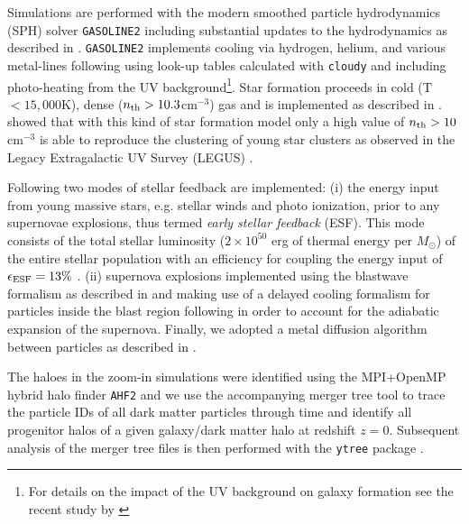 \documentclass[useAMS,usenatbib]{mnras}
\begin{document}
Simulations are performed with the modern smoothed particle hydrodynamics (SPH) solver {\texttt{GASOLINE2}} \citep{Wadsley2017} including substantial updates to the hydrodynamics as described in \citet{Keller2014}. {\texttt{GASOLINE2}} implements cooling via hydrogen, helium, and various metal-lines following \citet{Shen2010} using look-up tables calculated with \texttt{cloudy} \citep[version 07.02;][]{Ferland1998} and including photo-heating from the \citet{Haardt2005} UV background\footnote{For details on the impact of the UV background on galaxy formation see the recent study by \citet{Obreja2019}}. Star formation proceeds in cold (T $< 15,000$K), dense ($n_{\rm  th}  >  10.3$cm$^{-3}$) gas and is implemented as described in \citet{Stinson2006}. \citet{Buck2019a} showed that with this kind of star formation model only a high value of $n_{\rm  th}>10$cm$^{-3}$ \citep[see also][for an extended parameter study]{Dutton2019,Dutton2020} is able to reproduce the clustering of young star clusters as observed in the Legacy Extragalactic UV Survey (LEGUS) \citep{Calzetti2015,Grasha2017}.

Following \citet{Stinson2013} two modes of stellar feedback are implemented: (i) the energy input from young massive stars, e.g. stellar winds and photo ionization, prior to any supernovae explosions, thus termed \textit{early stellar feedback} (ESF). This mode consists of the total stellar luminosity ($2 \times 10^{50}$ erg of thermal energy per $M_{\odot}$) of the entire stellar population with an efficiency for coupling the energy input of $\epsilon_{\rm ESF}=13\%$ \citep{Wang2015}. (ii) supernova explosions implemented using the blastwave formalism as described in \citet{Stinson2006} and making use of a delayed cooling formalism for particles inside the blast region following \citet{McKee1977} in order to account for the adiabatic expansion of the supernova.
Finally, we adopted a metal diffusion algorithm between particles as described in \citet{Wadsley2008}.

The haloes in the zoom-in simulations were identified using the MPI+OpenMP hybrid halo finder \texttt{AHF2} \citep{Knollmann2009} and we use the accompanying merger tree tool to trace the particle IDs of all dark matter particles through time and identify all progenitor halos of a given galaxy/dark matter halo at redshift $z=0$. Subsequent analysis of the merger tree files is then performed with the {\texttt {ytree}} package \citep{ytree}. 

\begin{figure*}
\end{figure*}
\end{document}

